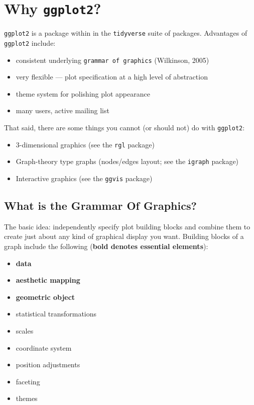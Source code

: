 \documentclass[
]{book}
\providecommand{\tightlist}{%
  \setlength{\itemsep}{0pt}\setlength{\parskip}{0pt}}
\begin{document}
\hypertarget{why-ggplot2}{%
\section{\texorpdfstring{Why \texttt{ggplot2}?}{Why ggplot2?}}\label{why-ggplot2}}

\texttt{ggplot2} is a package within in the \texttt{tidyverse} suite of packages. Advantages of \texttt{ggplot2} include:

\begin{itemize}
\tightlist
\item
  consistent underlying \texttt{grammar\ of\ graphics} (Wilkinson, 2005)
\item
  very flexible --- plot specification at a high level of abstraction
\item
  theme system for polishing plot appearance
\item
  many users, active mailing list
\end{itemize}

That said, there are some things you cannot (or should not) do with \texttt{ggplot2}:

\begin{itemize}
\tightlist
\item
  3-dimensional graphics (see the \texttt{rgl} package)
\item
  Graph-theory type graphs (nodes/edges layout; see the \texttt{igraph} package)
\item
  Interactive graphics (see the \texttt{ggvis} package)
\end{itemize}

\hypertarget{what-is-the-grammar-of-graphics}{%
\subsection{What is the Grammar Of Graphics?}\label{what-is-the-grammar-of-graphics}}

The basic idea: independently specify plot building blocks and combine them to create just
about any kind of graphical display you want. Building blocks of a graph include the
following (\textbf{bold denotes essential elements}):

\begin{itemize}
\tightlist
\item
  \textbf{data}
\item
  \textbf{aesthetic mapping}
\item
  \textbf{geometric object}
\item
  statistical transformations
\item
  scales
\item
  coordinate system
\item
  position adjustments
\item
  faceting
\item
  themes
\end{itemize}
\end{document}

